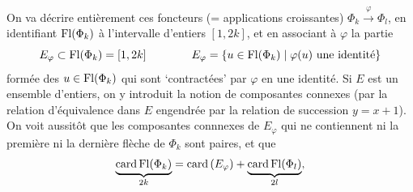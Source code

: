 On va décrire entièrement ces foncteurs (= applications croissantes) $\Phi_k\xrightarrow{\varphi}\Phi_l$, en identifiant $\operatorname{Fl}(\Phi_k)$ à l'intervalle d'entiers $[1,2k]$, et en associant à $\varphi$ la partie
\[
E_\varphi\subset\operatorname{Fl}(\Phi_k)=[1,2k]\qquad\qquad E_\varphi=\{u\in\operatorname{Fl}(\Phi_k)\mid\varphi(u)\text{ une identité}\}
\]
formée des $u\in\operatorname{Fl}(\Phi_k)$ qui sont `contractées' par $\varphi$ en une identité. Si $E$ est un ensemble d'entiers, on y introduit la notion de composantes connexes (par la relation d'équivalence dans $E$ engendrée par la relation de succession $y=x+1$). On voit aussitôt que les composantes connnexes de $E_\varphi$ qui ne contiennent ni la première ni la dernière flèche de $\Phi_k$ sont paires, et que %
\[
\underbrace{\mathrm{card}\operatorname{Fl}(\Phi_k)}_{2k}=\mathrm{card}\,(E_\varphi)+\underbrace{\mathrm{card}\operatorname{Fl}(\Phi_l)}_{2l},
\]


